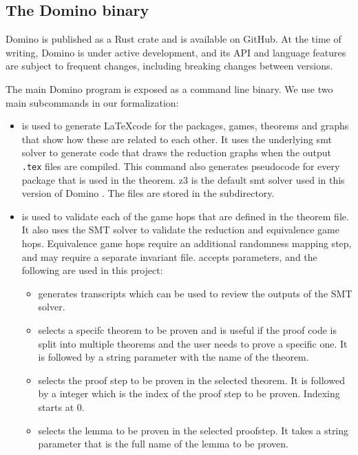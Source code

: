 \subsection{The Domino binary}
\label{subsec:architecture}
Domino is published as a Rust crate and is available on GitHub. At the time of writing, Domino is under active development, and its API and language features are subject to frequent changes, including breaking changes between versions.

The main Domino program is exposed as a command line binary. We use two main subcommands in our formalization: 
\begin{itemize}
    \item {} is used to generate \LaTeX  code for the packages, games, theorems and graphs that show how these are related to each other. It uses the underlying \acrshort{smt} solver to generate code that draws the reduction graphs when the output \lstinline|.tex| files are compiled. This command also generates pseudocode for every package that is used in the theorem. \acrshort{z3} is the default \acrshort{smt} solver used in this version of Domino \cite{domino:code}. The  files are stored in the  subdirectory.
    \item {} is used to validate each of the game hops that are defined in the theorem file. It also uses the SMT solver to validate the reduction and equivalence game hops. Equivalence game hops require an additional randomness mapping step, and may require a separate invariant file.  accepts parameters, and the following are used in this project:
    \begin{itemize}
        \item {} generates transcripts which can be used to review the outputs of the SMT solver.
        \item {} selects a specifc theorem to be proven and is useful if the proof code is split into multiple theorems and the user needs to prove a specific one. It is followed by a string parameter with the name of the theorem.
        \item {} selects the proof step to be proven in the selected theorem. It is followed by a integer which is the index of the proof step to be proven. Indexing starts at 0.
        \item {} selects the lemma to be proven in the selected proofstep. It takes a string parameter that is the full name of the lemma to be proven. 
    \end{itemize}
\end{itemize}  

